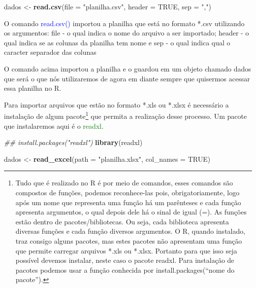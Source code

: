 \documentclass[titlepage, oneside, openany, a4paper]{book}
\newenvironment{Shaded}{\begin{snugshade}}{\end{snugshade}}
\newcommand{\CommentTok}[1]{\textcolor[rgb]{0.56,0.35,0.01}{\textit{#1}}}
\newcommand{\DataTypeTok}[1]{\textcolor[rgb]{0.13,0.29,0.53}{#1}}
\newcommand{\KeywordTok}[1]{\textcolor[rgb]{0.13,0.29,0.53}{\textbf{#1}}}
\newcommand{\NormalTok}[1]{#1}
\newcommand{\OtherTok}[1]{\textcolor[rgb]{0.56,0.35,0.01}{#1}}
\newcommand{\StringTok}[1]{\textcolor[rgb]{0.31,0.60,0.02}{#1}}
\begin{document}
\begin{Shaded}
\begin{Highlighting}[]
\NormalTok{dados <-}\StringTok{ }\KeywordTok{read.csv}\NormalTok{(}\DataTypeTok{file =} \StringTok{"planilha.csv"}\NormalTok{, }\DataTypeTok{header =} \OtherTok{TRUE}\NormalTok{, }\DataTypeTok{sep =} \StringTok{","}\NormalTok{)}
\end{Highlighting}
\end{Shaded}

O comando \textcolor{blue}{read.csv()} importou a planilha que está no formato *.csv utilizando os argumentos: file - o qual indica o nome do arquivo a ser importado; header - o qual indica se as colunas da planilha tem nome e sep - o qual indica qual o caracter separador das colunas

O comando acima importou a planilha e o guardou em um objeto chamado dados que será o que nós utilizaremos de agora em diante sempre que quisermos acessar essa planilha no R.

Para importar arquivos que estão no formato *.xls ou *.xlsx é necessário a instalação de algum pacote\footnote{Tudo que é realizado no R é por meio de comandos, esses comandos são compostos de funções, podemos reconhece-las pois, obrigatoriamente, logo após um nome que representa uma função há um parênteses e cada função apresenta argumentos, o qual depois dele há o sinal de igual (=). As funções estão dentro de pacotes/bibliotecas. Ou seja, cada biblioteca apresenta diversas funções e cada função diversos argumentos. O R, quando instalado, traz consigo alguns pacotes, mas estes pacotes não apresentam uma função que permite carregar arquivos *.xls ou *.xlsx. Portanto para que isso seja possível devemos instalar, neste caso o pacote readxl. Para instalação de pacotes podemos usar a função conhecida por install.packages(``nome do pacote'').} que permita a realização desse processo. Um pacote que instalaremos aqui é o \textcolor{green}{readxl}.

\begin{Shaded}
\begin{Highlighting}[]
\CommentTok{## install.packages("readxl")}
\KeywordTok{library}\NormalTok{(readxl)}
\end{Highlighting}
\end{Shaded}

\begin{Shaded}
\begin{Highlighting}[]
\NormalTok{dados <-}\StringTok{ }\KeywordTok{read_excel}\NormalTok{(}\DataTypeTok{path =} \StringTok{"planilha.xlsx"}\NormalTok{, }\DataTypeTok{col_names =} \OtherTok{TRUE}\NormalTok{)}
\end{Highlighting}
\end{Shaded}
\end{document}
